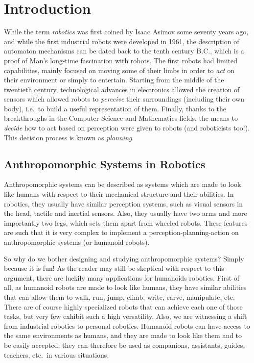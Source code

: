 \chapter{Introduction} 
\label{chap:chap0}

While the term \emph{robotics} was first coined by Isaac Asimov some
seventy years ago, and while the first industrial robots were
developed in 1961, the description of automaton mechanisms can
be dated back to the tenth century B.C., which is a proof of Man's
long-time fascination with robots. The first robots had limited
capabilities, mainly focused on moving some of their limbs in order to
\emph{act} on their environment or simply to entertain. Starting from
the middle of the twentieth century, technological advances in
electronics allowed the creation of sensors which allowed robots to
\emph{perceive} their surroundings (including their own body), i.e.\ to
build a useful representation of them. Finally, thanks to the
breakthroughs in the Computer Science and Mathematics fields, the
means to \emph{decide} how to act based on perception were given to
robots (and roboticists too!). This decision process is known as
\emph{planning}.

\section*{Anthropomorphic Systems in Robotics}

Anthropomorphic systems can be described as systems which are made to
look like humans with respect to their mechanical structure and their
abilities. In robotics, they usually have similar perception systems,
such as visual sensors in the head, tactile and inertial
sensors. Also, they usually have two arms and more importantly two
legs, which sets them apart from wheeled robots. These features are
such that it is very complex to implement a perception-planning-action
on anthropomorphic systems (or humanoid robots).

So why do we bother designing and studying anthropomorphic systems?
Simply because it is fun! As the reader may still be skeptical with
respect to this argument, there are luckily many applications for
humanoids robotics. First of all, as humanoid robots are made to look
like humans, they have similar abilities that can allow them to walk,
run, jump, climb, write, carve, manipulate, etc. There are of course
highly specialized robots that can achieve each one of those tasks,
but very few exhibit such a high versatility. Also, we are witnessing
a shift from industrial robotics to personal robotics. Humanoid robots
can have access to the same environments as humans, and they are made
to look like them and to be easily accepted: they can therefore be
used as companions, assistants, guides, teachers, etc.\ in various
situations.


